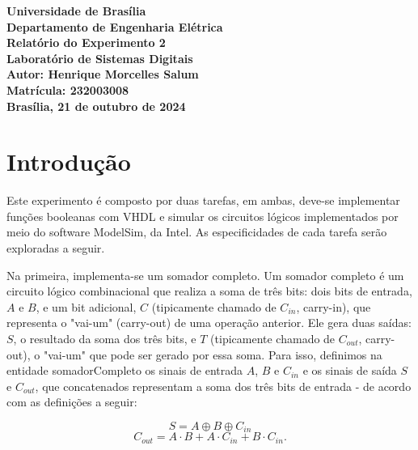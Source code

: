 \documentclass[a4paper,12pt]{article}
\begin{document}
\begin{titlepage}
    \begin{center}
        \vspace*{2cm}
        {\Large \textbf{Universidade de Brasília}} \\
        {\Large \textbf{Departamento de Engenharia Elétrica}} \\
        \vspace{3cm}
        {\Huge \textbf{Relatório do Experimento 2}} \\
        \vspace{2cm}
        {\Large \textbf{Laboratório de Sistemas Digitais}} \\
        \vspace{2cm}
        {\Large \textbf{Autor: Henrique Morcelles Salum}} \\
        {\Large \textbf{Matrícula: 232003008}} \\
        \vspace{2cm}
        {\Large \textbf{Brasília, 21 de outubro de 2024}}
    \end{center}
\end{titlepage}

\newpage
\tableofcontents
\newpage

\section{Introdução}
Este experimento é composto por duas tarefas, em ambas, deve-se implementar funções booleanas com VHDL e simular os circuitos lógicos implementados por meio do software ModelSim, da Intel. As especificidades de cada tarefa serão exploradas a seguir.

Na primeira, implementa-se um somador completo. Um somador completo é um circuito lógico combinacional que realiza a soma de três bits: dois bits de entrada, $A$ e $B$, e um bit adicional, $C$ (tipicamente chamado de $C_{in}$, carry-in), que representa o "vai-um" (carry-out) de uma operação anterior. Ele gera duas saídas: $S$, o resultado da soma dos três bits, e $T$ (tipicamente chamado de $C_{out}$, carry-out), o "vai-um" que pode ser gerado por essa soma. Para isso, definimos na entidade somadorCompleto os sinais de entrada $A$, $B$ e $C_{in}$ e os sinais de saída $S$ e $C_{out}$, que concatenados representam a soma dos três bits de entrada - de acordo com as definições a seguir:

\[
S = A \oplus B \oplus C_{in}
\]
\[
C_{out} = A \cdot B + A \cdot C_{in} + B \cdot C_{in}.
\]
\end{document}
